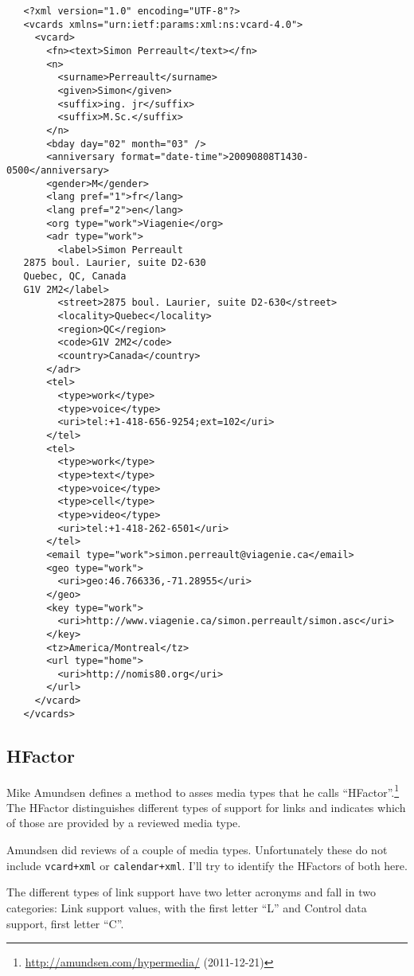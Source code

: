 \documentclass[12pt,a4paper]{scrartcl}		%
\newcommand{\citeurl}[2]{\url{#1} (#2)}
\begin{document}
\begin{lstlisting}
   <?xml version="1.0" encoding="UTF-8"?>
   <vcards xmlns="urn:ietf:params:xml:ns:vcard-4.0">
     <vcard>
       <fn><text>Simon Perreault</text></fn>
       <n>
         <surname>Perreault</surname>
         <given>Simon</given>
         <suffix>ing. jr</suffix>
         <suffix>M.Sc.</suffix>
       </n>
       <bday day="02" month="03" />
       <anniversary format="date-time">20090808T1430-0500</anniversary>
       <gender>M</gender>
       <lang pref="1">fr</lang>
       <lang pref="2">en</lang>
       <org type="work">Viagenie</org>
       <adr type="work">
         <label>Simon Perreault
   2875 boul. Laurier, suite D2-630
   Quebec, QC, Canada
   G1V 2M2</label>
         <street>2875 boul. Laurier, suite D2-630</street>
         <locality>Quebec</locality>
         <region>QC</region>
         <code>G1V 2M2</code>
         <country>Canada</country>
       </adr>
       <tel>
         <type>work</type>
         <type>voice</type>
         <uri>tel:+1-418-656-9254;ext=102</uri>
       </tel>
       <tel>
         <type>work</type>
         <type>text</type>
         <type>voice</type>
         <type>cell</type>
         <type>video</type>
         <uri>tel:+1-418-262-6501</uri>
       </tel>
       <email type="work">simon.perreault@viagenie.ca</email>
       <geo type="work">
         <uri>geo:46.766336,-71.28955</uri>
       </geo>
       <key type="work">
         <uri>http://www.viagenie.ca/simon.perreault/simon.asc</uri>
       </key>
       <tz>America/Montreal</tz>
       <url type="home">
         <uri>http://nomis80.org</uri>
       </url>
     </vcard>
   </vcards>
\end{lstlisting}

\subsection{HFactor}
Mike Amundsen defines a method to asses media types that he calls
``HFactor''.\footnote{\citeurl{http://amundsen.com/hypermedia/}{2011-12-21}} The
HFactor distinguishes different types of support for links and indicates which
of those are provided by a reviewed media type.

Amundsen did reviews of a couple of media types. Unfortunately these do not
include \texttt{vcard+xml} or \texttt{calendar+xml}. I'll try to identify the
HFactors of both here.

The different types of link support have two letter acronyms and fall in two
categories: Link support values, with the first letter ``L'' and Control data
support, first letter ``C''.
\end{document}
